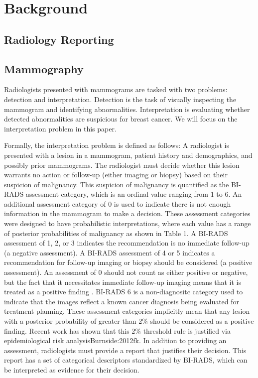 \chapter{Background}

\section{Radiology Reporting}


\section{Mammography}
Radiologists presented with mammograms are tasked with two problems: detection and interpretation. Detection is the task of visually inspecting the mammogram and identifying abnormalities. Interpretation is evaluating whether detected abnormalities are suspicious for breast cancer. We will focus on the interpretation problem in this paper.

Formally, the interpretation problem is defined as follows: A radiologist is presented with a lesion in a mammogram, patient history and demographics, and possibly prior mammograms. The radiologist must decide whether this lesion warrants no action or follow-up (either imaging or biopsy) based on their suspicion of malignancy. This suspicion of malignancy is quantified as the BI-RADS assessment category, which is an ordinal value ranging from 1 to 6. An additional assessment category of 0 is used to indicate there is not enough information in the mammogram to make a decision. These assessment categories were designed to have probabilistic interpretations, where each value has a range of posterior probabilities of malignancy as shown in Table 1. A BI-RADS assessment of 1, 2, or 3 indicates the recommendation is no immediate follow-up (a negative assessment). A BI-RADS assessment of 4 or 5 indicates a recommendation for follow-up imaging or biopsy should be considered (a positive assessment). An assessment of 0 should not count as either positive or negative, but the fact that it necessitates immediate follow-up imaging means that it is treated as a positive finding \cite{Barlow:2004cy}. BI-RADS 6 is a non-diagnositc category used to indicate that the images reflect a known cancer diagnosis being evaluated for treatment planning. These assessment categories implicitly mean that any lesion with a posterior probability of greater than 2\% should be considered as a positive finding. Recent work has shown that this 2\% threshold rule is justified via epidemiological risk analysis{Burnside:2012fk}. In addition to providing an assessment, radiologists must provide a report that justifies their decision. This report has a set of categorical descriptors standardized by BI-RADS, which can be interpreted as evidence for their decision.

